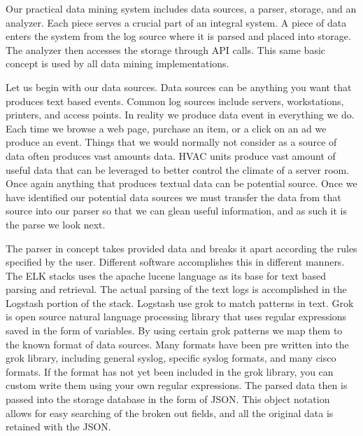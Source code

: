 \documentclass{acm_proc_article-sp}
\begin{document}
Our practical data mining system includes data sources, a parser, storage, and an analyzer.  Each piece serves a crucial part of an integral system.  A piece of data enters the system from the log source where it is parsed and placed into storage.  The analyzer then accesses the storage through API calls.  This same basic concept is used by all data mining implementations.

Let us begin with our data sources.  Data sources can be anything you want that produces text based events.  Common log sources include servers, workstations, printers, and access points.  In reality we produce data event in everything we do. Each time we browse a web page, purchase an item, or a click on an ad we produce an event.  Things that we would normally not consider as a source of data often produces vast amounts data.  HVAC units produce vast amount of useful data that can be leveraged to better control the climate of a server room.  Once again anything that produces textual data can be potential source.  Once we have identified our potential data sources we must transfer the data from that source into our parser so that we can glean useful information, and as such it is the parse we look next.

The parser in concept takes provided data and breaks it apart according the rules specified by the user.  Different software accomplishes this in different manners.  The ELK stacks uses the apache lucene language as its base for text based parsing and retrieval.   The actual parsing of the text logs is accomplished in the Logstash portion of the stack.  Logstash use grok to match patterns in text.  Grok is open source natural language processing library that uses regular expressions saved in the form of variables.  By using certain grok patterns we map them to the known format of data sources.  Many formats have been pre written into the grok library, including general syslog, specific syslog formats, and many cisco formats.  If the format has not yet been included in the grok library, you can custom write them using your own regular expressions.  The parsed data then is passed into the storage database in the form of JSON.  This object notation allows for easy searching of the broken out fields, and all the original data is retained with the JSON.
\end{document}
